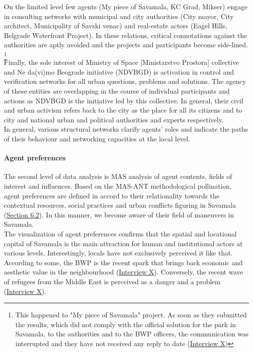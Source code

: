 \documentclass[11pt]{report}
\begin{document}
On the limited level few agents (My piece of Savamala, KC Grad, Mikser) engage in consulting networks with municipal and city authorities (City mayor, City architect, Municipality of Savski venac) and real-estate actors (Eagel Hills, Belgrade Waterfront Project).
In these relations, critical connotations against the authorities are aptly avoided and the projects and participants become side-lined.
\footnote{This happened to "My piece of Savamala" project.  As soon as they submitted the results, which did not comply with the official solution for the park in Savamala, to the authorities and to the BWP officers, the communication was interrupted and they have not received any reply to date
(\href{InterviewX}{Interview X})}
\\

Finally, the sole interest of Ministry of Space [Ministarstvo Prostora] collective and Ne da(vi)mo Beograde initiative (NDVBGD) is activation in control and verification networks for all urban questions, problems and solutions.
The agency of these entities are overlapping in the course of individual participants and actions as NDVBGD is the initiative led by this collective.
In general, their civil and urban activism refers back to the city as the place for all its citizens and to city and national urban and political authorities and experts respectively.
\\

In general, various structural networks clarify agents’ roles and indicate the paths of their behaviour and networking capacities at the local level.

\paragraph{Agent preferences}

The second level of data analysis is MAS analysis of agent contents, fields of interest and influences.
Based on the MAS-ANT methodological pollination, agent preferences are defined in accord to their relationality towards the contextual resources, social practices and urban conflicts figuring in Savamala (\href{Section 6.2}{Section 6.2}).
In this manner, we become aware of their field of maneuvers in Savamala. 
\\

The visualization of agent preferences confirms that the spatial and locational capital of Savamala is the main attraction for human and institutional actors at various levels.
Interestingly, locals have not exclusively perceived it like that.
According to some, the BWP is the recent spark that brings back economic and aesthetic value in the neighbourhood
(\href{InterviewX}{Interview X}).
Conversely, the recent wave of refugees from the Middle East is perceived as a danger and a problem 
(\href{InterviewX}{Interview X}).
\\
\end{document}
